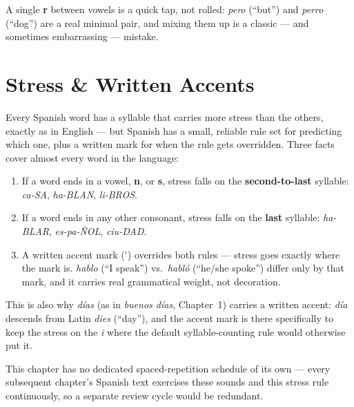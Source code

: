 A single \textbf{r} between vowels is a quick tap, not rolled: \emph{pero}
(``but'') and \emph{perro} (``dog'') are a real minimal pair, and mixing
them up is a classic --- and sometimes embarrassing --- mistake.

\section{Stress \& Written Accents}

Every Spanish word has a syllable that carries more stress than the
others, exactly as in English --- but Spanish has a small, reliable rule
set for predicting which one, plus a written mark for when the rule gets
overridden. Three facts cover almost every word in the language:

\begin{enumerate}
  \item If a word ends in a vowel, \textbf{n}, or \textbf{s}, stress falls
    on the \textbf{second-to-last} syllable: \emph{ca-SA}, \emph{ha-BLAN},
    \emph{li-BROS}.
  \item If a word ends in any other consonant, stress falls on the
    \textbf{last} syllable: \emph{ha-BLAR}, \emph{es-pa-\~{N}OL},
    \emph{ciu-DAD}.
  \item A written accent mark (\'{}) overrides both rules --- stress goes
    exactly where the mark is. \emph{hablo} (``I speak'') vs.\ \emph{habl\'{o}}
    (``he/she spoke'') differ only by that mark, and it carries real
    grammatical weight, not decoration.
\end{enumerate}

\begin{etymology}
This is also why \emph{d\'{i}as} (as in \emph{buenos d\'{i}as}, Chapter~1)
carries a written accent: \emph{d\'{i}a} descends from Latin \emph{dies}
(``day''), and the accent mark is there specifically to keep the stress on
the \emph{i} where the default syllable-counting rule would otherwise put
it.
\end{etymology}

This chapter has no dedicated spaced-repetition schedule of its own ---
every subsequent chapter's Spanish text exercises these sounds and this
stress rule continuously, so a separate review cycle would be redundant.
